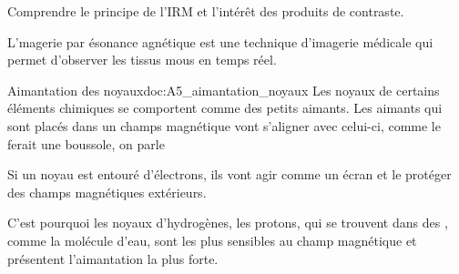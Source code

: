 \teteTermStssImag
\vspace*{-36pt}


\begin{objectifs}
  \item Comprendre le principe de l'IRM et l'intérêt des produits de contraste.
\end{objectifs}

\begin{contexte}
  L'magerie par ésonance agnétique est une technique d'imagerie médicale qui permet d'observer les tissus mous en temps réel.

\end{contexte}


\begin{doc}{Aimantation des noyaux}{doc:A5_aimantation_noyaux}
  Les noyaux de certains éléments chimiques se comportent comme des petits aimants.
  Les aimants qui sont placés dans un champs magnétique vont s'aligner avec celui-ci, comme le ferait une boussole, on parle 
  
  Si un noyau est entouré d'électrons, ils vont agir comme un écran et le protéger des champs magnétiques extérieurs.

  C'est pourquoi les noyaux d'hydrogènes, les protons, qui se trouvent dans des , comme la molécule d'eau, sont les plus sensibles au champ magnétique et présentent l'aimantation la plus forte.
\end{doc}


